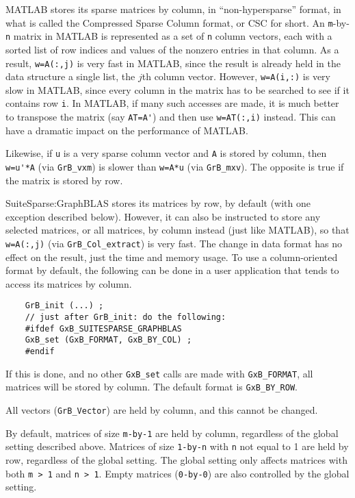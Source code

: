 \documentclass[12pt]{article}
\begin{document}
MATLAB stores its sparse matrices by column, in ``non-hypersparse'' format, in
what is called the Compressed Sparse Column format, or CSC for short.  An
\verb'm'-by-\verb'n' matrix in MATLAB is represented as a set of \verb'n'
column vectors, each with a sorted list of row indices and values of the
nonzero entries in that column.  As a result, \verb'w=A(:,j)' is very fast in
MATLAB, since the result is already held in the data structure a single list,
the $j$th column vector.  However, \verb'w=A(i,:)' is very slow in MATLAB,
since every column in the matrix has to be searched to see if it contains row
\verb'i'.  In MATLAB, if many such accesses are made, it is much better to
transpose the matrix (say \verb"AT=A'") and then use \verb"w=AT(:,i)" instead.
This can have a dramatic impact on the performance of MATLAB.

Likewise, if \verb'u' is a very sparse column vector and \verb'A' is stored by
column, then \verb"w=u'*A" (via \verb'GrB_vxm') is slower than \verb'w=A*u'
(via \verb'GrB_mxv').  The opposite is true if the matrix is stored by row.

SuiteSparse:GraphBLAS stores its matrices by row, by default (with one
exception described below).  However, it can also be instructed to store any
selected matrices, or all matrices, by column instead (just like MATLAB), so
that \verb'w=A(:,j)' (via \verb'GrB_Col_extract') is very fast.  The change in
data format has no effect on the result, just the time and memory usage.  To
use a column-oriented format by default, the following can be done in a user
application that tends to access its matrices by column.

    {\footnotesize
    \begin{verbatim}
    GrB_init (...) ;
    // just after GrB_init: do the following:
    #ifdef GxB_SUITESPARSE_GRAPHBLAS
    GxB_set (GxB_FORMAT, GxB_BY_COL) ;
    #endif \end{verbatim} }

If this is done, and no other \verb'GxB_set' calls are made with
\verb'GxB_FORMAT', all matrices will be stored by column.
The default format is \verb'GxB_BY_ROW'.

All vectors (\verb'GrB_Vector') are held by column, and this cannot be changed.

By default, matrices of size \verb'm-by-1' are held by column, regardless of
the global setting described above.  Matrices of size \verb'1-by-n' with
\verb'n' not equal to 1 are held by row, regardless of the global setting.
The global setting only affects matrices with both \verb'm > 1' and \verb'n > 1'.
Empty matrices (\verb'0-by-0') are also controlled by the global setting.
\end{document}
